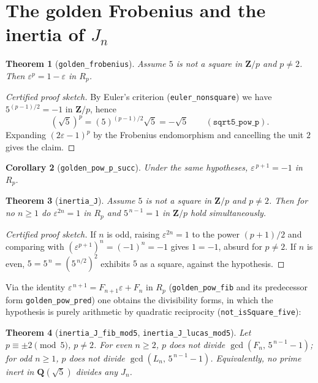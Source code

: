 \documentclass[11pt]{amsart}
\newtheorem{theorem}{Theorem}[section]
\newtheorem{corollary}[theorem]{Corollary}
\theoremstyle{remark}
\newcommand{\eps}{\varepsilon}
\newcommand{\Z}{\mathbf{Z}}
\newcommand{\lean}[1]{\texttt{#1}}
\begin{document}
\section{The golden Frobenius and the inertia of \texorpdfstring{\(J_n\)}{Jn}}

\begin{theorem}[\lean{golden\_frobenius}]\label{thm:frob}
Assume \(5\) is not a square in \(\Z/p\) and \(p\neq2\). Then
\(\eps^p=1-\eps\) in \(R_p\).
\end{theorem}

\begin{proof}[Certified proof sketch]
By Euler's criterion (\lean{euler\_nonsquare}) we have
\(5^{(p-1)/2}=-1\) in \(\Z/p\), hence
\[
(\sqrt5)^p=(5)^{(p-1)/2}\sqrt5=-\sqrt5
\qquad(\lean{sqrt5\_pow\_p}).
\]
Expanding \((2\eps-1)^p\) by the Frobenius endomorphism and
cancelling the unit \(2\) gives the claim.
\end{proof}

\begin{corollary}[\lean{golden\_pow\_p\_succ}]\label{cor:halfperiod}
Under the same hypotheses, \(\eps^{\,p+1}=-1\) in \(R_p\).
\end{corollary}

\begin{theorem}[\lean{inertia\_J}]\label{thm:inertia}
Assume \(5\) is not a square in \(\Z/p\) and \(p\neq2\). Then for no
\(n\ge1\) do \(\eps^{2n}=1\) in \(R_p\) and \(5^{\,n-1}=1\) in
\(\Z/p\) hold simultaneously.
\end{theorem}

\begin{proof}[Certified proof sketch]
If \(n\) is odd, raising \(\eps^{2n}=1\) to the power \((p+1)/2\) and
comparing with \((\eps^{p+1})^n=(-1)^n=-1\) gives \(1=-1\), absurd for
\(p\neq2\). If \(n\) is even, \(5=5^{\,n}=(5^{\,n/2})^2\) exhibits
\(5\) as a square, against the hypothesis.
\end{proof}

Via the identity \(\eps^{\,n+1}=F_{n+1}\eps+F_n\) in \(R_p\)
(\lean{golden\_pow\_fib} and its predecessor form
\lean{golden\_pow\_pred}) one obtains the divisibility forms, in
which the hypothesis is purely arithmetic by quadratic reciprocity
(\lean{not\_isSquare\_five}):

\begin{theorem}[\lean{inertia\_J\_fib\_mod5},
\lean{inertia\_J\_lucas\_mod5}]\label{thm:inertiadvd}
Let \(p\equiv\pm2\pmod5\), \(p\neq2\). For even \(n\ge2\), \(p\) does
not divide \(\gcd(F_n,\,5^{\,n-1}-1)\); for odd \(n\ge1\), \(p\) does
not divide \(\gcd(L_n,\,5^{\,n-1}-1)\). Equivalently, no prime inert
in \(\mathbf{Q}(\sqrt5)\) divides any \(J_n\).
\end{theorem}
\end{document}
